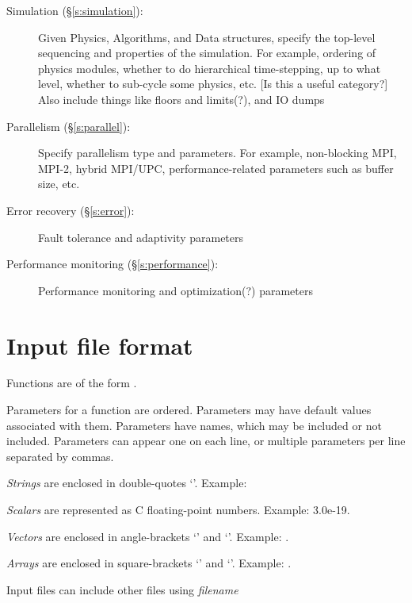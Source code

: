 \documentclass{book}
\begin{document}
\begin{description}
 \item [Simulation (\S\ref{s:simulation}): ] Given Physics, Algorithms, and Data structures,
 specify the top-level sequencing and properties of the simulation.
 For example, ordering of physics modules, whether to do hierarchical
 time-stepping, up to what level, whether to sub-cycle some physics,
 etc. [Is this a useful category?]  Also include things like floors
 and limits(?), and IO dumps

 \item [Parallelism (\S\ref{s:parallel}): ] Specify parallelism type and parameters.  For
 example, non-blocking MPI, MPI-2, hybrid MPI/UPC, performance-related
 parameters such as buffer size, etc.

 \item [Error recovery (\S\ref{s:error}): ] Fault tolerance and adaptivity parameters

 \item [Performance monitoring (\S\ref{s:performance}): ] Performance monitoring and
 optimization(?) parameters
\end{description}

\section{Input file format}

Functions are of the form .

Parameters for a function are ordered.  Parameters may have default
values associated with them.  Parameters have names, which may be
included or not included.  Parameters can appear one on each line, or
multiple parameters per line separated by commas.

\textit{Strings} are enclosed in double-quotes `'.  Example: 

\textit{Scalars} are represented as C floating-point numbers.  Example: 3.0e-19.

\textit{Vectors} are enclosed in angle-brackets `\code{$<$}' and `\code{$>$}'.  Example: .

\textit{Arrays} are enclosed in square-brackets `\code{[}' and `\code{]}'.  Example: \code{[3e9,$<$3,4,5$>$, "density"]}.

Input files can include other files using \textit{filename}
\end{document}
